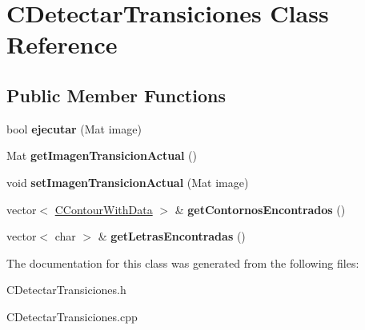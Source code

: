 \hypertarget{classCDetectarTransiciones}{}\section{C\+Detectar\+Transiciones Class Reference}
\label{classCDetectarTransiciones}
\subsection*{Public Member Functions}
\begin{DoxyCompactItemize}
\item 
bool {\bfseries ejecutar} (Mat image)\hypertarget{classCDetectarTransiciones_a19b374a5d7b5ddb01fada5b3a9d952d7}{}\label{classCDetectarTransiciones_a19b374a5d7b5ddb01fada5b3a9d952d7}

\item 
Mat {\bfseries get\+Imagen\+Transicion\+Actual} ()\hypertarget{classCDetectarTransiciones_aa9cea5befc08385a46baf86adc305737}{}\label{classCDetectarTransiciones_aa9cea5befc08385a46baf86adc305737}

\item 
void {\bfseries set\+Imagen\+Transicion\+Actual} (Mat image)\hypertarget{classCDetectarTransiciones_a9f341c8df22490d46b266844b16f8585}{}\label{classCDetectarTransiciones_a9f341c8df22490d46b266844b16f8585}

\item 
vector$<$ \hyperlink{classCContourWithData}{C\+Contour\+With\+Data} $>$ \& {\bfseries get\+Contornos\+Encontrados} ()\hypertarget{classCDetectarTransiciones_a729c3aaffe2cc888e62c81a58814c1e9}{}\label{classCDetectarTransiciones_a729c3aaffe2cc888e62c81a58814c1e9}

\item 
vector$<$ char $>$ \& {\bfseries get\+Letras\+Encontradas} ()\hypertarget{classCDetectarTransiciones_a1e7c9eac75874737cf7a2b7d7a4375c7}{}\label{classCDetectarTransiciones_a1e7c9eac75874737cf7a2b7d7a4375c7}

\end{DoxyCompactItemize}


The documentation for this class was generated from the following files\+:\begin{DoxyCompactItemize}
\item 
C\+Detectar\+Transiciones.\+h\item 
C\+Detectar\+Transiciones.\+cpp\end{DoxyCompactItemize}

